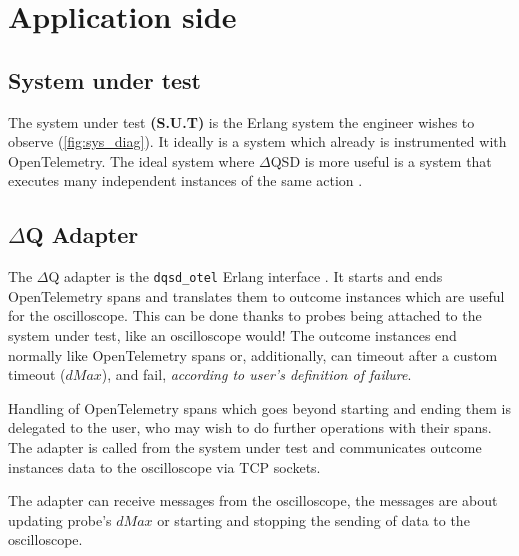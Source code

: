 \section{Application side} 
    \subsection{System under test} The system under test \textbf{(S.U.T)} is the Erlang system the engineer wishes to observe (\cref{fig:sys_diag}). It ideally is a system which already is instrumented with OpenTelemetry. The ideal system where $\Delta$QSD is more useful is a system that executes many independent instances of the same action \cite{dq-tut}. 
    
    \subsection{$\Delta$Q Adapter} 
    The $\Delta$Q adapter is the \texttt{dqsd\_otel} Erlang interface \cite{wrapper}. It starts and ends OpenTelemetry spans and translates them to outcome instances which are useful for the oscilloscope. This can be done thanks to probes being attached to the system under test, like an oscilloscope would! The outcome instances end normally like OpenTelemetry spans or, additionally, can timeout after a custom timeout ($dMax$), and fail, \textit{according to user's definition of failure}. 
    
    Handling of OpenTelemetry spans which goes beyond starting and ending them is delegated to the user, who may wish to do further operations with their spans. 
    The adapter is called from the system under test and communicates outcome instances data to the oscilloscope via TCP sockets. 
    
    The adapter can receive messages from the oscilloscope, the messages are about updating probe's $dMax$ or starting and stopping the sending of data to the oscilloscope.
